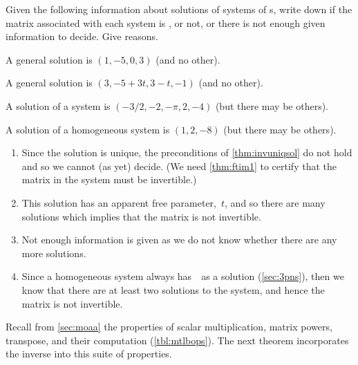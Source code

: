 \begin{example} 
Given the following information about solutions of systems of s, write down if the matrix associated with each system is , or not, or there is not enough given information to decide.  Give reasons.
\begin{Parts}
\item A general solution is \((1,-5,0,3)\) (and no other).
\item A general solution is \((3,-5+3t,3-t,-1)\) (and no other).
\item A solution of a system is \((-3/2,-2,-\pi,2,-4)\) (but there may be others).
\item A solution of a homogeneous system is \((1,2,-8)\) (but there may be others).
\end{Parts}
\begin{solution} 
\begin{enumerate}
\item Since the solution is unique, the preconditions of \cref{thm:invuniqsol} do not hold and so we cannot (as yet) decide. 
(We need \cref{thm:ftim1} to certify that the matrix in the system must be invertible.)
\item This solution has an apparent free parameter,~\(t\), and so there are many solutions which implies that the matrix is not invertible.
\item Not enough information is given as we do not know whether there are any more solutions.
\item Since a homogeneous system always has~\ov\ as a solution (\cref{sec:3pns}), then we know that there are at least two solutions to the system, and hence the matrix is not invertible.
\end{enumerate}
\end{solution}
\end{example}




Recall from \cref{sec:moaa} the properties of scalar multiplication, matrix powers, transpose, and their computation (\cref{tbl:mtlbops}).
The next theorem incorporates the inverse into this suite of properties.


